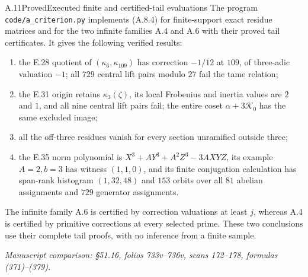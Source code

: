 \begin{statement}{A.11}{Proved}{Executed finite and certified-tail evaluations}
The program \texttt{code/a\_criterion.py} implements (A.8.4) for
finite-support exact residue matrices and for the two infinite
families A.4 and A.6 with their proved tail certificates.
It gives the following verified results:
\begin{enumerate}
\item the E.28 quotient of $(\kappa_6,\kappa_{109})$ has correction
$-1/12$ at $109$, of three-adic valuation $-1$; all $729$ central
lift pairs modulo $27$ fail the tame relation;
\item the E.31 origin retains $\kappa_3(\zeta)$, its local
Frobenius and inertia values are $2$ and $1$, and all nine
central lift pairs fail; the entire coset $\alpha+3\mathcal K_0$
has the same excluded image;
\item all the off-three residues vanish for every section
unramified outside three;
\item the E.35 norm polynomial is
$X^3+AY^3+A^2Z^3-3AXYZ$, its example $A=2,b=3$ has witness
$(1,1,0)$, and its finite conjugation calculation has span-rank
histogram $(1,32,48)$ and $153$ orbits over all $81$ abelian
assignments and $729$ generator assignments.
\end{enumerate}
The infinite family A.6 is certified by correction valuations at
least $j$, whereas A.4 is certified by primitive corrections at
every selected prime. These two conclusions use their complete
tail proofs, with no inference from a finite sample.
\par\smallskip\noindent\emph{Manuscript comparison: \S51.16,
folios 733v--736v, scans 172--178, formulas (371)--(379).}
\end{statement}
